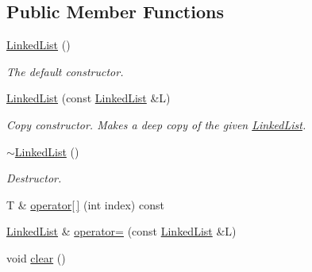 \subsection*{Public Member Functions}
\begin{DoxyCompactItemize}
\item 
\mbox{\label{classssuds_1_1_linked_list_ad9bf044b5580f2a5507fc0a4c6e9c887}} 
\mbox{\hyperlink{classssuds_1_1_linked_list_ad9bf044b5580f2a5507fc0a4c6e9c887}{Linked\+List}} ()
\begin{DoxyCompactList}\small\item\em The default constructor. \end{DoxyCompactList}\item 
\mbox{\label{classssuds_1_1_linked_list_a1e4e00ed5aba2e52cd30cab344094bc1}} 
\mbox{\hyperlink{classssuds_1_1_linked_list_a1e4e00ed5aba2e52cd30cab344094bc1}{Linked\+List}} (const \mbox{\hyperlink{classssuds_1_1_linked_list}{Linked\+List}} \&L)
\begin{DoxyCompactList}\small\item\em Copy constructor. Makes a deep copy of the given \mbox{\hyperlink{classssuds_1_1_linked_list}{Linked\+List}}. \end{DoxyCompactList}\item 
\mbox{\label{classssuds_1_1_linked_list_aee10e508a0b0319531f22498135f00f9}} 
\mbox{\hyperlink{classssuds_1_1_linked_list_aee10e508a0b0319531f22498135f00f9}{$\sim$\+Linked\+List}} ()
\begin{DoxyCompactList}\small\item\em Destructor. \end{DoxyCompactList}\item 
T \& \mbox{\hyperlink{classssuds_1_1_linked_list_a00b8ec9b1a82165bd18422a18671a375}{operator\mbox{[}$\,$\mbox{]}}} (int index) const
\item 
\mbox{\hyperlink{classssuds_1_1_linked_list}{Linked\+List}} \& \mbox{\hyperlink{classssuds_1_1_linked_list_a1bc1219e0c1598c9d8ff24a617b99f40}{operator=}} (const \mbox{\hyperlink{classssuds_1_1_linked_list}{Linked\+List}} \&L)
\item 
\mbox{\label{classssuds_1_1_linked_list_a5db25fa94ebc906c2ec5a4bcd430da38}} 
void \mbox{\hyperlink{classssuds_1_1_linked_list_a5db25fa94ebc906c2ec5a4bcd430da38}{clear}} ()

\end{DoxyCompactItemize}
